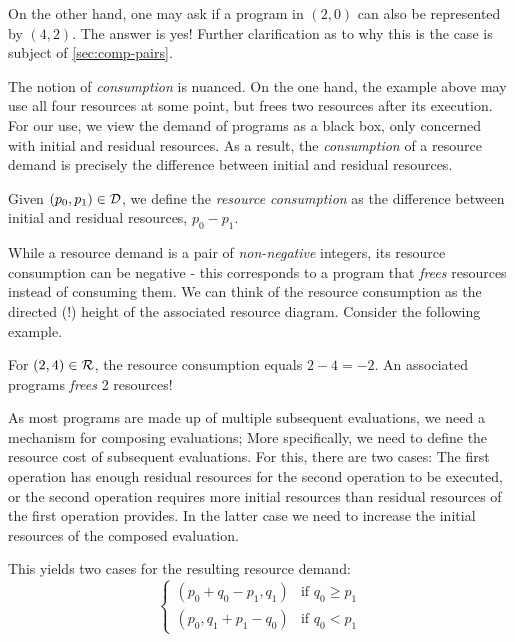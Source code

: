 On the other hand, one may ask if a program in \((2, 0)\) can also be represented by \((4, 2)\). The answer is yes! Further clarification as to why this is the case is subject of \cref{sec:comp-pairs}.

The notion of \emph{consumption} is nuanced. On the one hand, the example above may use all four resources at some point, but frees two resources after its execution. For our use, we view the demand of programs as a black box, only concerned with initial and residual resources. As a result, the \emph{consumption} of a resource demand is precisely the difference between initial and residual resources. 

\begin{definition}\label{def:resource-consumption}
   Given \((p_0, p_1) \in \mathcal{D}\), we define the \emph{resource consumption} as the difference between initial and residual resources, \(p_0 - p_1\).
\end{definition}

While a resource demand is a pair of \emph{non-negative} integers, its resource consumption can be negative - this corresponds to a program that \emph{frees} resources instead of consuming them. We can think of the resource consumption as the directed (!) height of the associated resource diagram. Consider the following example.

\begin{example}
   For \((2, 4) \in \mathcal{R}\), the resource consumption equals \(2 - 4 = -2\). An associated programs \emph{frees} 2 resources!


\end{example}

As most programs are made up of multiple subsequent evaluations, we need a mechanism for composing evaluations; More specifically, we need to define the resource cost of subsequent evaluations. 
For this, there are two cases: The first operation has enough residual resources for the second operation to be executed, or the second operation requires more initial resources than residual resources of the first operation provides. In the latter case we need to increase the initial resources of the composed evaluation.

This yields two cases for the resulting resource demand:
\[
   \begin{cases}
      (p_0 + q_0 - p_1,  q_1) & \mbox{if } q_0 \geq p_1 \\
      (p_0,q_1 + p_1 - q_0) & \mbox{if } q_0 <    p_1 
   \end{cases}
\]

